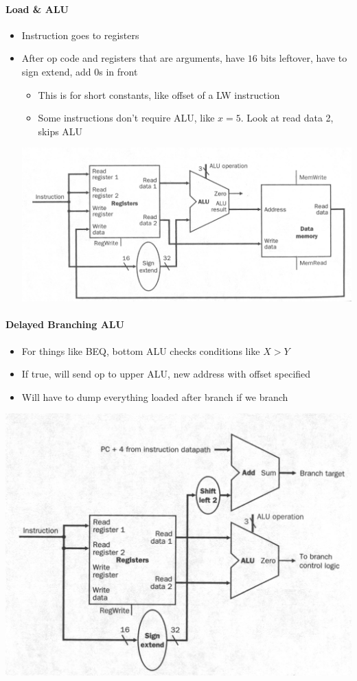 \documentclass[12 pt]{article}
\begin{document}
		\paragraph{Load \& ALU} 		\begin{itemize}
		\item Instruction goes to registers
		\item After op code and registers that are arguments, have $16$ bits leftover, have to sign extend, add $0$s in front
		\begin{itemize}
		\item This is for short constants, like offset of a LW instruction
		\item Some instructions don't require ALU, like $x=5$. Look at read data 2, skips ALU
\end{itemize}\includegraphics[scale=0.3]{load}

\end{itemize}
		\paragraph{Delayed Branching ALU}
		\begin{itemize}
		\item For things like BEQ, bottom ALU checks conditions like $X>Y$
		\item If true, will send op to upper ALU, new address with offset specified
		\item Will have to dump everything loaded after branch if we branch
\end{itemize}
		\includegraphics[scale=0.3]{dalu}
\end{document}
